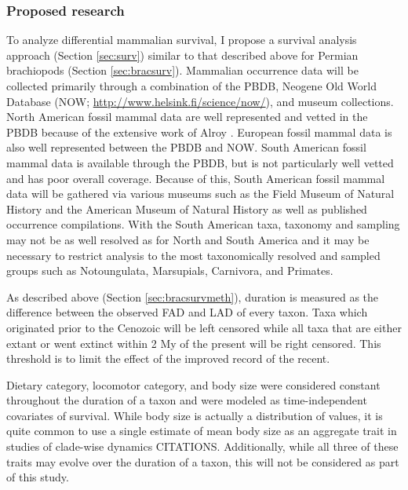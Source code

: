 \documentclass[12pt,letterpaper]{article}
\begin{document}
\subsubsection{Proposed research} \label{sec:mamsurvmeth}
To analyze differential mammalian survival, I propose a survival analysis approach (Section \ref{sec:surv}) similar to that described above for Permian brachiopods (Section \ref{sec:bracsurv}).  Mammalian occurrence data will be collected primarily through a combination of the PBDB, Neogene Old World Database (NOW; \url{http://www.helsink.fi/science/now/}), and museum collections. North American fossil mammal data are well represented and vetted in the PBDB because of the extensive work of Alroy \citep{Alroy1996a,Alroy1998,Alroy2000g}. European fossil mammal data is also well represented between the PBDB and NOW. South American fossil mammal data is available through the PBDB, but is not particularly well vetted and has poor overall coverage. Because of this, South American fossil mammal data will be gathered via various museums such as the Field Museum of Natural History and the American Museum of Natural History as well as published occurrence compilations. With the South American taxa, taxonomy and sampling may not be as well resolved as for North and South America and it may be necessary to restrict analysis to the most taxonomically resolved and sampled groups such as Notoungulata, Marsupials, Carnivora, and Primates.

As described above (Section \ref{sec:bracsurvmeth}), duration is measured as the difference between the observed FAD and LAD of every taxon. Taxa which originated prior to the Cenozoic will be left censored while all taxa that are either extant or went extinct within 2 My of the present will be right censored. This threshold is to limit the effect of the improved record of the recent.

Dietary category, locomotor category, and body size were considered constant throughout the duration of a taxon and were modeled as time-independent covariates of survival. While body size is actually a distribution of values, it is quite common to use a single estimate of mean body size as an aggregate trait \citep{Jablonski2008a} in studies of clade-wise dynamics CITATIONS. Additionally, while all three of these traits may evolve over the duration of a taxon, this will not be considered as part of this study.
\end{document}
